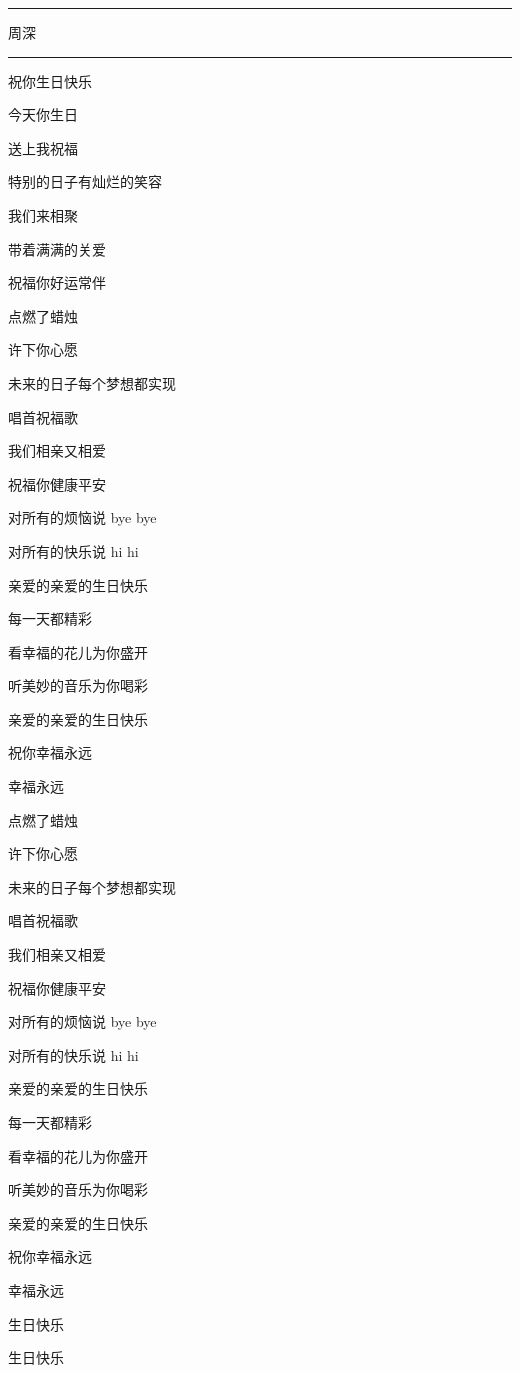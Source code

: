 \documentclass[]{ctexbook}
\begin{document}
\begin{center}\rule{0.5\linewidth}{0.5pt}\end{center}

周深

\begin{center}\rule{0.5\linewidth}{0.5pt}\end{center}

祝你生日快乐

今天你生日

送上我祝福

特别的日子有灿烂的笑容

我们来相聚

带着满满的关爱

祝福你好运常伴

点燃了蜡烛

许下你心愿

未来的日子每个梦想都实现

唱首祝福歌

我们相亲又相爱

祝福你健康平安

对所有的烦恼说 bye bye

对所有的快乐说 hi hi

亲爱的亲爱的生日快乐

每一天都精彩

看幸福的花儿为你盛开

听美妙的音乐为你喝彩

亲爱的亲爱的生日快乐

祝你幸福永远

幸福永远

点燃了蜡烛

许下你心愿

未来的日子每个梦想都实现

唱首祝福歌

我们相亲又相爱

祝福你健康平安

对所有的烦恼说 bye bye

对所有的快乐说 hi hi

亲爱的亲爱的生日快乐

每一天都精彩

看幸福的花儿为你盛开

听美妙的音乐为你喝彩

亲爱的亲爱的生日快乐

祝你幸福永远

幸福永远

生日快乐

生日快乐
\end{document}

